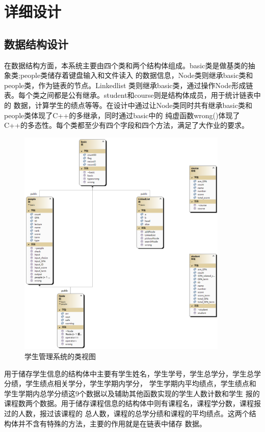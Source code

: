 \documentclass[fontset=windows]{article}
\begin{document}
\section{详细设计}
\subsection{数据结构设计}
在数据结构方面，本系统主要由四个类和两个结构体组成。basic类是做基类的抽象类;people类储存着键盘输入和文件读入
的数据信息，Node类则继承basic类和people类，作为链表的节点。Linkedlist
类则继承basic类，通过操作Node形成链表。每个类之间都是公有继承。student和course则是结构体成员，用于统计链表中的
数据，计算学生的绩点等等。在设计中通过让Node类同时共有继承basic类和people类体现了C++的多继承，同时通过basic中的
纯虚函数wrong()体现了C++的多态性。每个类都至少有四个字段和四个方法，满足了大作业的要求。

\begin{figure}[h!]
	\begin{center}
		\includegraphics[height = 11cm]{ClassDiagram.png}
		\vspace{1cm}
		\caption{学生管理系统的类视图}
	\end{center}
\end{figure}

用于储存学生信息的结构体中主要有学生姓名，学生学号，学生总学分，学生总学分绩，学生绩点相关学分，学生学期内学分，
学生学期内平均绩点，学生绩点和学生学期内总学分绩这9个数据以及辅助其他函数实现的学生人数计数和学生
报的课程数两个数据。用于储存课程信息的结构体中则有课程名，课程学分数，课程报过的人数，报过该课程的
总人数，课程的总学分绩和课程的平均绩点。这两个结构体并不含有特殊的方法，主要的作用就是在链表中储存
数据。
\end{document}
